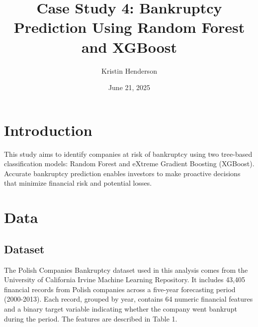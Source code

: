 \documentclass{article}      %
\title{Case Study 4: Bankruptcy Prediction Using Random Forest and XGBoost}
\author{Kristin Henderson}
\date{June 21, 2025}         %
\begin{document}

\maketitle                   %

\section{Introduction}       %

This study aims to identify companies at risk of bankruptcy using two tree-based classification models: Random Forest and eXtreme Gradient Boosting (XGBoost). Accurate bankruptcy prediction enables investors to make proactive decisions that minimize financial risk and potential losses.

\section{Data}

\subsection{Dataset}

The Polish Companies Bankruptcy dataset used in this analysis comes from the University of California Irvine Machine Learning Repository. It includes 43,405 financial records from Polish companies across a five-year forecasting period (2000-2013). Each record, grouped by year, contains 64 numeric financial features and a binary target variable indicating whether the company went bankrupt during the period. The features are described in Table 1.
\end{document}
